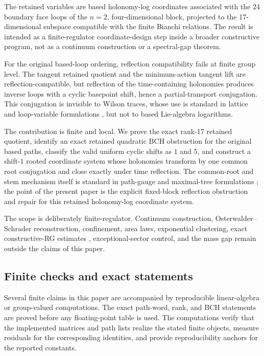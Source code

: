 \documentclass[10pt]{article}
\begin{document}
The retained variables are based holonomy-log coordinates associated with the 24 boundary face loops of the \(n=2\), four-dimensional block, projected to the 17-dimensional subspace compatible with the finite Bianchi relations.  The result is intended as a finite-regulator coordinate-design step inside a broader constructive program, not as a continuum construction or a spectral-gap theorem.

For the original based-loop ordering, reflection compatibility fails at finite group level.  The tangent retained quotient and the minimum-action tangent lift are reflection-compatible, but reflection of the time-containing holonomies produces inverse loops with a cyclic basepoint shift, hence a partial-transport conjugation.  This conjugation is invisible to Wilson traces, whose use is standard in lattice and loop-variable formulations \cite{Wilson1974,Mandelstam1968,Giles1981}, but not to based Lie-algebra logarithms.

The contribution is finite and local.  We prove the exact rank-17 retained quotient, identify an exact retained quadratic BCH obstruction for the original based paths, classify the valid uniform cyclic shifts as \(1\) and \(5\), and construct a shift-\(1\) rooted coordinate system whose holonomies transform by one common root conjugation and close exactly under time reflection.  The common-root and stem mechanism itself is standard in path-gauge and maximal-tree formulations \cite{Batrouni1982,BurbanoBauer2024}; the point of the present paper is the explicit fixed-block reflection obstruction and repair for this retained holonomy-log coordinate system.

The scope is deliberately finite-regulator.  Continuum construction, Osterwalder--Schrader reconstruction, confinement, area laws, exponential clustering, exact constructive-RG estimates \cite{Balaban1985Averaging,Balaban1985Variational,Balaban1987RGI}, exceptional-sector control, and the mass gap remain outside the claims of this paper.

\subsection{Finite checks and exact statements}

Several finite claims in this paper are accompanied by reproducible linear-algebra or group-valued computations.  The exact path-word, rank, and BCH statements are proved before any floating-point table is used.  The computations verify that the implemented matrices and path lists realize the stated finite objects, measure residuals for the corresponding identities, and provide reproducibility anchors for the reported constants.
\end{document}
